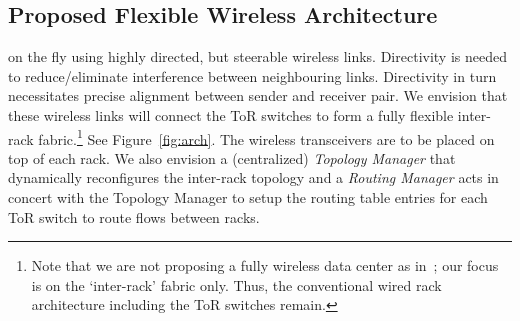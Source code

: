 \subsection{Proposed Flexible Wireless Architecture}



 on the fly using highly directed,
but steerable wireless links. Directivity is needed to
reduce/eliminate interference between neighbouring links. Directivity
in turn necessitates precise alignment between sender and receiver
pair.  We envision that these wireless links will connect the ToR
switches to form a fully flexible inter-rack fabric.\footnote{Note
  that we are not proposing a fully wireless data center as
  in~\cite{cornell}; our focus is on the `inter-rack' fabric
  only. Thus, the conventional wired rack architecture including the
  ToR switches remain.}  See Figure~\ref{fig:arch}.  The wireless
transceivers are to be placed on top of each rack.
%
We also envision a (centralized) {\em Topology Manager} that
dynamically reconfigures the inter-rack topology and a {\em Routing
  Manager} acts in concert with the Topology Manager to setup the
routing table entries for each ToR switch to route flows between
racks. 

